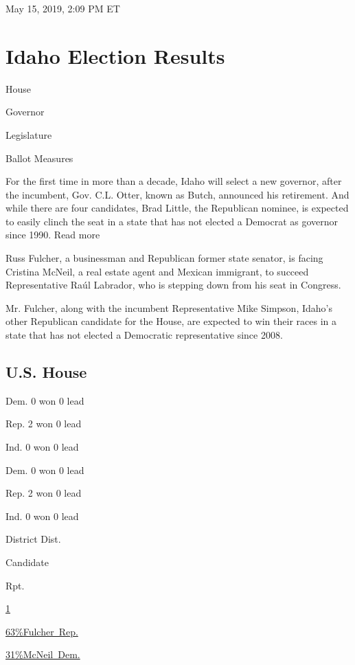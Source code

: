 May 15, 2019, 2:09 PM ET

\hypertarget{idaho-election-results}{%
\section{Idaho Election Results}\label{idaho-election-results}}

House

Governor

Legislature

Ballot Measures

For the first time in more than a decade, Idaho will select a new
governor, after the incumbent, Gov. C.L. Otter, known as Butch,
announced his retirement. And while there are four candidates, Brad
Little, the Republican nominee, is expected to easily clinch the seat in
a state that has not elected a Democrat as governor since 1990. Read
more

Russ Fulcher, a businessman and Republican former state senator, is
facing Cristina McNeil, a real estate agent and Mexican immigrant, to
succeed Representative Raúl Labrador, who is stepping down from his seat
in Congress.

Mr. Fulcher, along with the incumbent Representative Mike Simpson,
Idaho's other Republican candidate for the House, are expected to win
their races in a state that has not elected a Democratic representative
since 2008.

\hypertarget{us-house}{%
\subsection{U.S. House}\label{us-house}}

Dem. 0 won 0 lead

Rep. 2 won 0 lead

Ind. 0 won 0 lead

Dem. 0 won 0 lead

Rep. 2 won 0 lead

Ind. 0 won 0 lead

District Dist.

Candidate

Rpt.

\href{https://www.nytimes3xbfgragh.onion/elections/results/idaho-house-district-1}{1}

\href{https://www.nytimes3xbfgragh.onion/elections/results/idaho-house-district-1}{
63\%Fulcher~Rep.}

\href{https://www.nytimes3xbfgragh.onion/elections/results/idaho-house-district-1}{
31\%McNeil~Dem.}

